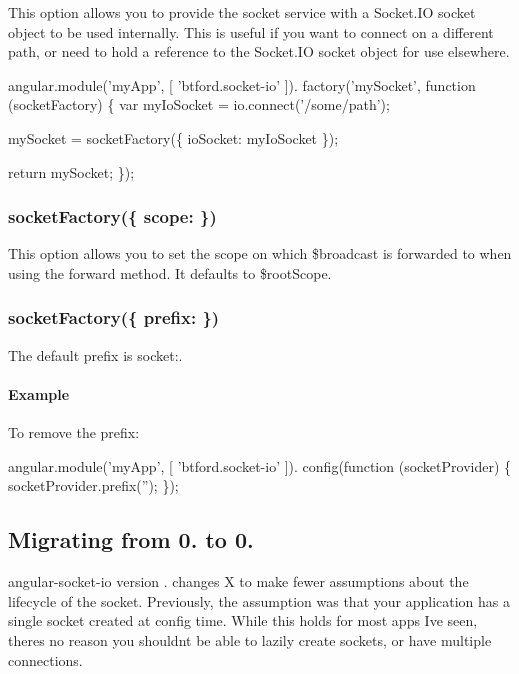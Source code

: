 This option allows you to provide the {\ttfamily socket} service with a {\ttfamily Socket.\+IO socket} object to be used internally. This is useful if you want to connect on a different path, or need to hold a reference to the {\ttfamily Socket.\+IO socket} object for use elsewhere.


\begin{DoxyCode}
angular.module('myApp', [
  'btford.socket-io'
]).
factory('mySocket', function (socketFactory) \{
  var myIoSocket = io.connect('/some/path');

  mySocket = socketFactory(\{
    ioSocket: myIoSocket
  \});

  return mySocket;
\});
\end{DoxyCode}


\subsubsection*{{\ttfamily socket\+Factory(\{ scope\+: \})}}

This option allows you to set the scope on which {\ttfamily \$broadcast} is forwarded to when using the {\ttfamily forward} method. It defaults to {\ttfamily \$root\+Scope}.

\subsubsection*{{\ttfamily socket\+Factory(\{ prefix\+: \})}}

The default prefix is {\ttfamily socket\+:}.

\paragraph*{Example}

To remove the prefix\+:


\begin{DoxyCode}
angular.module('myApp', [
  'btford.socket-io'
]).
config(function (socketProvider) \{
  socketProvider.prefix('');
\});
\end{DoxyCode}


\subsection*{Migrating from 0. to 0.}

{\ttfamily angular-\/socket-\/io} version {.} changes X to make fewer assumptions about the lifecycle of the socket. Previously, the assumption was that your application has a single socket created at config time. While this holds for most apps I\textquotesingle{}ve seen, there\textquotesingle{}s no reason you shouldn\textquotesingle{}t be able to lazily create sockets, or have multiple connections.

